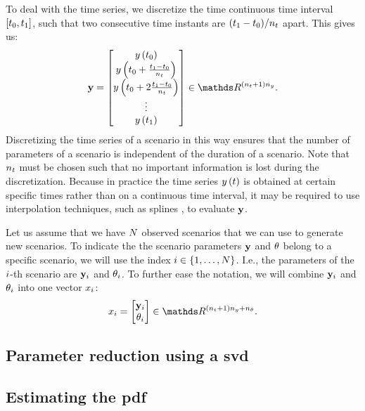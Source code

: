 To deal with the time series, we discretize the time continuous time interval $[t_0, t_1]$, such that two consecutive time instants are $(t_1 - t_0) / n_t$ apart. 
This gives us:
\begin{equation}
	\label{eq:time series vectorized}
	\timeseriesvec = \begin{bmatrix}
		\timeseries{\timestart} \\ 
		\timeseries{\timestart + \frac{\timeend - \timestart}{\numberoftimesegments}} \\
		\timeseries{\timestart + 2\frac{\timeend - \timestart}{\numberoftimesegments}} \\
		\vdots \\
		\timeseries{\timeend}
	\end{bmatrix} \in \realnumbers^{\left( \numberoftimesegments + 1 \right) \dimensiontimeseries}.
\end{equation}
Discretizing the time series of a scenario in this way ensures that the number of parameters of a scenario is independent of the duration of a scenario. 
Note that $n_t$ must be chosen such that no important information is lost during the discretization.
Because in practice the time series $y\left(t\right)$ is obtained at certain specific times rather than on a continuous time interval, it may be required to use interpolation techniques, such as splines \autocite{deboor1978practical}, to evaluate $\mathbf{y}$.

Let us assume that we have $N$ observed scenarios that we can use to generate new scenarios. 
To indicate the the scenario parameters $\mathbf{y}$ and $\theta$ belong to a specific scenario, we will use the index $i \in \{1,\ldots,N\}$. 
I.e., the parameters of the $i$-th scenario are $\mathbf{y}_{i}$ and $\theta_{i}$.
To further ease the notation, we will combine $\mathbf{y}_{i}$ and $\theta_{i}$ into one vector $x_{i}$:
\begin{equation}
	\label{eq:scenario parameters}
	\scenariopars_{\scenarioindex} = \begin{bmatrix}
		\timeseriesvec_{\scenarioindex} \\ \extraparameters_{\scenarioindex}
	\end{bmatrix} \in \realnumbers^{\left( \numberoftimesegments + 1 \right) \dimensiontimeseries + \dimensionextraparameters}.
\end{equation}



\subsection{Parameter reduction using a \acl{svd}}
\label{sec:svd}





\subsection{Estimating the \acl{pdf}}
\label{sec:kde}